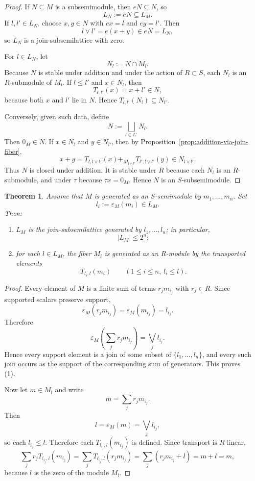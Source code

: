 \documentclass[11pt]{amsart}
\numberwithin{equation}{section}
\newtheorem{theorem}{Theorem}[section]
\theoremstyle{definition}
\begin{document}
\begin{proof}
If $N\subseteq M$ is a subsemimodule, then $eN\subseteq N$, so
\[
L_N:=eN\subseteq L_M.
\]
If $l,l'\in L_N$, choose $x,y\in N$ with $ex=l$ and $ey=l'$. Then
\[
l\vee l'=e(x+y)\in eN=L_N,
\]
so $L_N$ is a join-subsemilattice with zero.

For $l\in L_N$, let
\[
N_l:=N\cap M_l.
\]
Because $N$ is stable under addition and under the action of $R\subset S$, each $N_l$ is an $R$-submodule of $M_l$. If $l\le l'$ and $x\in N_l$, then
\[
T_{l,l'}(x)=x+l'\in N,
\]
because both $x$ and $l'$ lie in $N$. Hence $T_{l,l'}(N_l)\subseteq N_{l'}$.

Conversely, given such data, define
\[
N:=\bigsqcup_{l\in L'}N_l.
\]
Then $0_M\in N$. If $x\in N_l$ and $y\in N_{l'}$, then by Proposition~\ref{prop:addition-via-join-fiber},
\[
x+y
=
T_{l,l\vee l'}(x)+_{M_{l\vee l'}}T_{l',l\vee l'}(y)
\in N_{l\vee l'}.
\]
Thus $N$ is closed under addition. It is stable under $R$ because each $N_l$ is an $R$-submodule, and under $\tau$ because $\tau x=0_M$. Hence $N$ is an $S$-subsemimodule. 
\end{proof}

\begin{theorem}\label{thm:finite-generation}
Assume that $M$ is generated as an $S$-semimodule by $m_1,\dots,m_n$. Set
\[
l_i:=\varepsilon_M(m_i)\in L_M.
\]
Then:
\begin{enumerate}[label=(\arabic*)]
    \item $L_M$ is the join-subsemilattice generated by $l_1,\dots,l_n$; in particular,
    \[
    |L_M|\le 2^n;
    \]
    \item for each $l\in L_M$, the fiber $M_l$ is generated as an $R$-module by the transported elements
    \[
    T_{l_i,l}(m_i)
    \qquad
    (1\le i\le n,\ l_i\le l).
    \]
\end{enumerate}
\end{theorem}

\begin{proof}
Every element of $M$ is a finite sum of terms $r_jm_{i_j}$ with $r_j\in R$. Since supported scalars preserve support,
\[
\varepsilon_M(r_jm_{i_j})=\varepsilon_M(m_{i_j})=l_{i_j}.
\]
Therefore
\[
\varepsilon_M\!\left(\sum_j r_jm_{i_j}\right)=\bigvee_j l_{i_j}.
\]
Hence every support element is a join of some subset of $\{l_1,\dots,l_n\}$, and every such join occurs as the support of the corresponding sum of generators. This proves (1).

Now let $m\in M_l$ and write
\[
m=\sum_j r_jm_{i_j}.
\]
Then
\[
l=\varepsilon_M(m)=\bigvee_j l_{i_j},
\]
so each $l_{i_j}\le l$. Therefore each $T_{l_{i_j},l}(m_{i_j})$ is defined. Since transport is $R$-linear,
\[
\sum_j r_jT_{l_{i_j},l}(m_{i_j})
=
\sum_j T_{l_{i_j},l}(r_jm_{i_j})
=
\sum_j (r_jm_{i_j}+l)
=
m+l
=
m,
\]
because $l$ is the zero of the module $M_l$. 
\end{proof}
\end{document}
